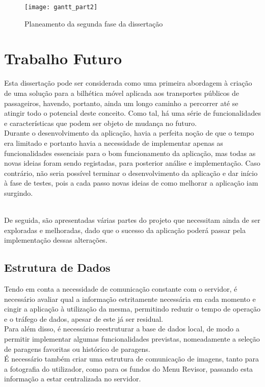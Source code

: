 \begin{figure}[t]
  \begin{center}
    \leavevmode
    \texttt{[image: gantt\_part2]}
    \caption{Planeamento da segunda fase da dissertação}
    \label{fig:gantt2}
  \end{center}
\end{figure}

\section{Trabalho Futuro}

Esta dissertação pode ser considerada como uma primeira abordagem à criação de uma solução para a bilhética móvel aplicada aos transportes públicos de passageiros, havendo, portanto, ainda um longo caminho a percorrer até se atingir todo o potencial deste conceito. Como tal, há uma série de funcionalidades e características que podem ser objeto de mudança no futuro.
\\Durante o desenvolvimento da aplicação, havia a perfeita noção de que o tempo era limitado e portanto havia a necessidade de implementar apenas as funcionalidades essenciais para o bom funcionamento da aplicação, mas todas as novas ideias foram sendo registadas, para posterior análise e implementação. Caso contrário, não seria possível terminar o desenvolvimento da aplicação e dar início à fase de testes, pois a cada passo novas ideias de como melhorar a aplicação iam surgindo.

~\\De seguida, são apresentadas várias partes do projeto que necessitam ainda de ser exploradas e melhoradas, dado que o sucesso da aplicação poderá passar pela implementação dessas alterações.

\subsection{Estrutura de Dados}

Tendo em conta a necessidade de comunicação constante com o servidor, é necessário avaliar qual a informação estritamente necessária em cada momento e cingir a aplicação à utilização da mesma, permitindo reduzir o tempo de operação e o tráfego de dados, apesar de este já ser residual.
\\Para além disso, é necessário reestruturar a base de dados local, de modo a permitir implementar algumas funcionalidades previstas, nomeadamente a seleção de paragens favoritas ou histórico de paragens.
\\É necessário também criar uma estrutura de comunicação de imagens, tanto para a fotografia do utilizador, como para os fundos do Menu Revisor, passando esta informação a estar centralizada no servidor.

